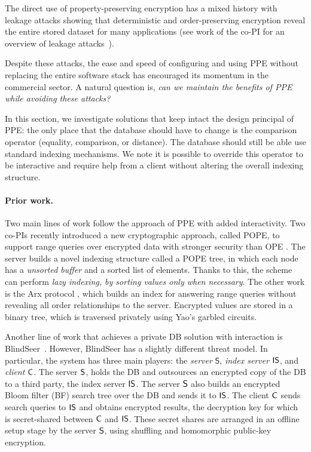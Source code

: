 
The direct use of property-preserving encryption has a mixed history
with leakage attacks showing that deterministic and order-preserving
encryption reveal the entire stored dataset for many applications (see
work of the co-PI for an overview of leakage
attacks~\cite{SP:FVYSHG17}).

Despite these attacks, the ease and speed of configuring and using PPE
without replacing the entire software stack has encouraged its momentum
in the commercial sector. A natural question is, \emph{can we maintain
the benefits of PPE while avoiding these attacks?}

In this section, we investigate solutions that keep intact
the design principal of PPE: the only place that the database should
have to change is the comparison operator (equality, comparison, or
distance).  The database should still be able use standard indexing
mechanisms.  We note it is possible to override this operator to be
interactive and require help from a client without altering the overall
indexing structure.

\paragraph{Prior work.}
Two main lines of work follow the approach of PPE with added
interactivity.  Two co-PIs recently introduced a new cryptographic
approach, called POPE, to support range queries over encrypted data with
stronger security than OPE \cite{CCS:RACY16}.
The server builds a novel indexing
structure called a POPE tree, in which each node has a {\it unsorted buffer}
and a sorted list of elements.  Thanks to this, the scheme can perform {\it
lazy indexing, by sorting values only when necessary}. 
%
The other work is the Arx protocol
\cite{EPRINT:PodBoePop16}, which builds an index for answering
range queries without revealing all order relationships to the server.
Encrypted values are stored in a binary tree, which is traversed
privately using Yao's garbled circuits.

Another line of work that achieves a private DB solution with interaction is
BlindSeer~\cite{SP:PKVKMC14,SP:FVKKKM15}. However, BlindSeer has a slightly
different threat model. In particular, the system has three main players: the
\emph{server} $\mathsf{S}$, {\em index server} $\sf IS$, and {\em client} $\sf
C$. The server $\sf S$, holds the DB and outsources an encrypted copy of the DB
to a third party, the index server $\sf IS$. The server $\sf S$  also builds an
encrypted Bloom filter (BF) search tree over the DB and sends it to $\sf IS$.
The client $\sf C$ sends search queries to $\sf IS$ and obtains encrypted
results, the decryption key for which is secret-shared between $\sf C$ and $\sf
IS$. These secret shares are arranged in an offline setup stage by the server
$\sf S$, using shuffling and homomorphic public-key encryption. 

